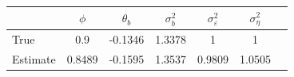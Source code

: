 \begin{tabular}{lcccccc}
\toprule
& $\phi$ & $\theta_b$ & $\sigma_b^2$ & $\sigma_\varepsilon^2$ & $\sigma_\eta^2$ \\
\midrule
True & 0.9 & -0.1346 & 1.3378 & 1 & 1 \\
Estimate & 0.8489 & -0.1595 & 1.3537 & 0.9809 & 1.0505 \\
\bottomrule
\end{tabular}

